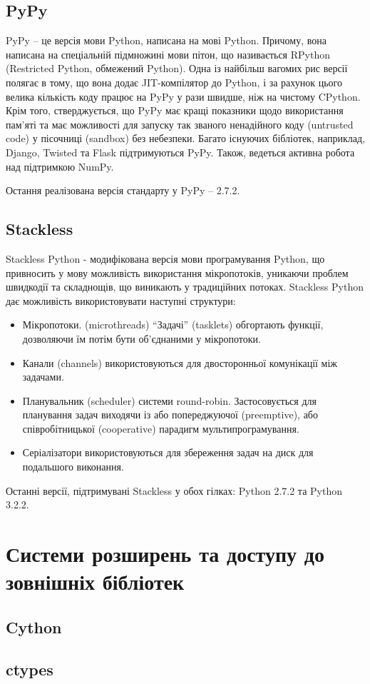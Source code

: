 \documentclass[a4paper, 12pt, onsedie]{article}
\begin{document}
\subsection{PyPy}
    PyPy -- це версія мови Python, написана на мові Python. Причому, вона написана на спеціальній 
    підмножині мови пітон, що називається RPython (Restricted Python, обмежений Python). Одна 
    із найбільш вагомих рис версії полягає в тому, що вона додає JIT-компілятор до Python, і за 
    рахунок цього велика кількість коду працює на PyPy у рази швидше, ніж на чистому CPython. 
    Крім того, стверджується, що PyPy має кращі показники щодо використання пам'яті та має 
    можливості для запуску так званого ненадійного коду (untrusted code) у пісочниці (sandbox) 
    без небезпеки. Багато існуючих бібліотек, наприклад, Django, Twisted та Flask підтримуються 
    PyPy. Також, ведеться активна робота над підтримкою NumPy.

    Остання реалізована версія стандарту у PyPy -- 2.7.2.

\subsection{Stackless}
    Stackless Python - модифікована версія мови програмування Python, що привносить у мову
    можливість використання мікропотоків, уникаючи проблем швидкодії та складнощів, що виникають
    у традиційних потоках. Stackless Python дає можливість використовувати наступні структури:
    \begin{itemize}
        \item Мікропотоки. (microthreads) ``Задачі'' (tasklets) обгортають функції, дозволяючи їм 
              потім бути об'єднаними у мікропотоки.
        \item Канали (channels) використовуються для двосторонньої комунікації між задачами.
        \item Планувальник (scheduler) системи round-robin. Застосовується для планування
              задач виходячи із або попереджуючої (preemptive), або співробітницької (cooperative) 
              парадигм мультипрограмування.
        \item Серіалізатори використовуються для збереження задач на диск для подальшого виконання.
    \end{itemize}

    Останні версії, підтримувані Stackless у обох гілках: Python 2.7.2 та Python 3.2.2.

\section{Системи розширень та доступу до зовнішніх бібліотек}

\subsection{Cython}

\subsection{ctypes}
\end{document}
